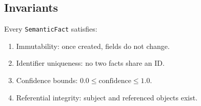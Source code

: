 \subsection{Invariants}
\label{sec:semantic-model:invariants}

Every \texttt{SemanticFact} satisfies:
\begin{enumerate}
    \item Immutability: once created, fields do not change.
    \item Identifier uniqueness: no two facts share an ID.
    \item Confidence bounds: $0.0 \leq \text{confidence} \leq 1.0$.
    \item Referential integrity: subject and referenced objects exist.
\end{enumerate}

